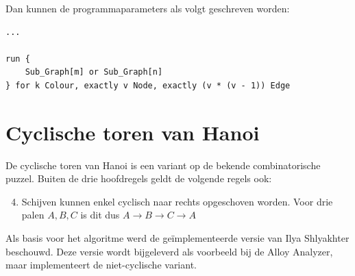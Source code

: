 \documentclass[10pt,a4paper]{article}
\begin{document}
		Dan kunnen de programmaparameters als volgt geschreven worden:\\

		\begin{lstlisting}
...

run {
	Sub_Graph[m] or Sub_Graph[n]
} for k Colour, exactly v Node, exactly (v * (v - 1)) Edge
		\end{lstlisting}

		\clearpage{}
		

	\clearpage{}
	\section{Cyclische toren van Hanoi}
		De cyclische toren van Hanoi is een variant op de bekende combinatorische puzzel. Buiten de drie hoofdregels geldt de volgende regels ook:
		\begin{enumerate}
			\setcounter{enumi}{3}
			\item Schijven kunnen enkel cyclisch naar rechts opgeschoven worden. Voor drie palen $A, B, C$ is dit dus $A \rightarrow B \rightarrow C \rightarrow A$
		\end{enumerate}

		\noindent Als basis voor het algoritme werd de ge\"implementeerde versie van Ilya Shlyakhter beschouwd. Deze versie wordt bijgeleverd als voorbeeld bij de Alloy Analyzer, maar implementeert de niet-cyclische variant.

		
\end{document}

